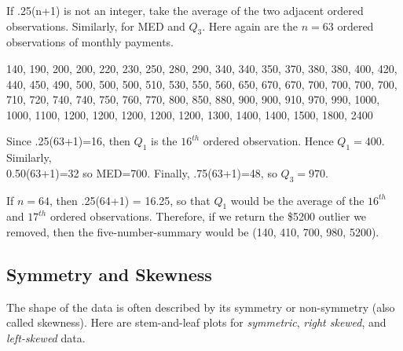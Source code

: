 \documentclass[11pt, chapterprefix=true]{scrbook}\usepackage[]{graphicx}\usepackage[]{color}
\begin{document}
If .25(n+1) is not an integer, take the average of the two adjacent ordered observations.  Similarly, for MED and $Q_3$.  Here again are the $n = 63$ ordered observations of monthly payments.

{\small{
140, 190, 200, 200, 220, 230, 250, 280, 290, 340, 340, 350, 370, 380, 380, 400, 420, 440, 450, 490, 500, 500, 500, 510, 530, 550, 560, 650, 670, 670, 700, 700, 700, 700, 710, 720, 740, 740, 750, 760, 770, 800, 850, 880, 900, 900, 910, 970, 990, 1000, 1000, 1100, 1200, 1200, 1200, 1200, 1200, 1300, 1400, 1400, 1500, 1800, 2400
}}


Since .25(63+1)=16, then $Q_1$ is the $16^{th}$ ordered observation.  Hence $Q_1 = 400$.  Similarly, \\ 0.50(63+1)=32 so MED=700.  Finally, .75(63+1)=48, so $Q_3 = 970$.

If $n = 64$, then .25(64+1) = 16.25, so that $Q_1$ would be the average of the $16^{th}$ and $17^{th}$ ordered observations.  Therefore, if we return the \$5200 outlier we removed, then the five-number-summary would be (140, 410, 700, 980, 5200).

\subsection{Symmetry and Skewness}

The shape of the data is often described by its symmetry or non-symmetry (also called skewness).  Here are stem-and-leaf plots for \textit{symmetric}, \textit{right skewed}, and \textit{left-skewed} data.

\vspace{3mm}
\end{document}
